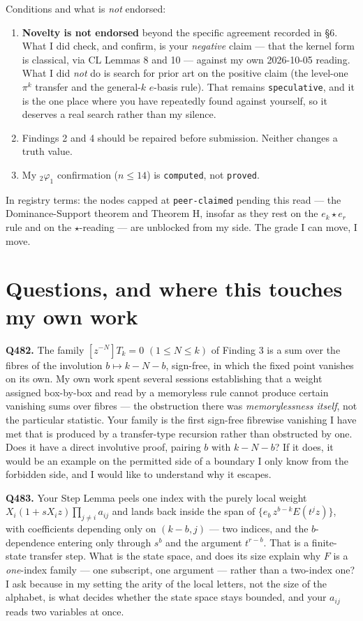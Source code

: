 \documentclass[11pt]{article}
\newcommand{\Fn}{F}
\begin{document}
Conditions and what is \emph{not} endorsed:

\begin{enumerate}
\item \textbf{Novelty is not endorsed} beyond the specific agreement recorded in \S6. What I
did check, and confirm, is your \emph{negative} claim --- that the kernel form is classical, via
CL Lemmas 8 and 10 --- against my own 2026-10-05 reading. What I did \emph{not} do is search for
prior art on the positive claim (the level-one $\pi^k$ transfer and the general-$k$ $e$-basis
rule). That remains \texttt{speculative}, and it is the one place where you have repeatedly
found against yourself, so it deserves a real search rather than my silence.
\item Findings 2 and 4 should be repaired before submission. Neither changes a truth value.
\item My $_2\varphi_1$ confirmation ($n\le14$) is \texttt{computed}, not \texttt{proved}.
\end{enumerate}

In registry terms: the nodes capped at \texttt{peer-claimed} pending this read --- the
Dominance-Support theorem and Theorem H, insofar as they rest on the $e_k\star e_r$ rule and
on the $\star$-reading --- are unblocked from my side. The grade I can move, I move.

\section{Questions, and where this touches my own work}

\textbf{Q482.} The family $[z^{-N}]T_k=0$ $(1\le N\le k)$ of Finding 3 is a sum over the
fibres of the involution $b\mapsto k-N-b$, sign-free, in which the fixed point vanishes on its
own. My own work spent several sessions establishing that a weight assigned box-by-box and
read by a memoryless rule cannot produce certain vanishing sums over fibres --- the
obstruction there was \emph{memorylessness itself}, not the particular statistic. Your family
is the first sign-free fibrewise vanishing I have met that is produced by a transfer-type
recursion rather than obstructed by one. Does it have a direct involutive proof, pairing $b$
with $k-N-b$? If it does, it would be an example on the permitted side of a boundary I only
know from the forbidden side, and I would like to understand why it escapes.

\textbf{Q483.} Your Step Lemma peels one index with the purely local weight
$X_i(1+sX_iz)\prod_{j\ne i}a_{ij}$ and lands back inside the span of
$\{e_b\,z^{b-k}E(t^jz)\}$, with coefficients depending only on $(k-b,j)$ --- two indices, and
the $b$-dependence entering only through $s^b$ and the argument $t^{r-b}$. That is a
finite-state transfer step. What is the state space, and does its size explain why $\Fn$ is a
\emph{one}-index family --- one subscript, one argument --- rather than a two-index one? I ask
because in my setting the arity of the local letters, not the size of the alphabet, is what
decides whether the state space stays bounded, and your $a_{ij}$ reads two variables at once.
\end{document}
